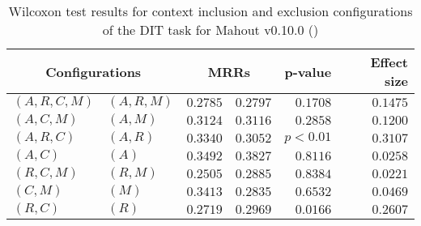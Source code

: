 
\begin{table}
\begin{spacing}{1.2}
\centering
\caption{Wilcoxon test results for context inclusion and exclusion configurations of the DIT task for Mahout v0.10.0 (\ctwo)}
\label{table:versus-wilcox-mahout-dit-context}
\begin{tabular}{ll|rr|rr}
\toprule
      \multicolumn{2}{c|}{Configurations} &                \multicolumn{2}{c|}{MRRs} &             p-value & Effect size \\
\midrule
 $(A,R,C,M)$ &  $(A,R,M)$ &       $0.2785$ &  $\bm{0.2797}$ & $0.1708$ &    $0.1475$ \\
   $(A,C,M)$ &    $(A,M)$ &  $\bm{0.3124}$ &       $0.3116$ & $0.2858$ &    $0.1200$ \\
   $(A,R,C)$ &    $(A,R)$ &  $\bm{0.3340}$ &       $0.3052$ & $p<0.01$ &    $0.3107$ \\
     $(A,C)$ &      $(A)$ &       $0.3492$ &  $\bm{0.3827}$ & $0.8116$ &    $0.0258$ \\
   $(R,C,M)$ &    $(R,M)$ &       $0.2505$ &  $\bm{0.2885}$ & $0.8384$ &    $0.0221$ \\
     $(C,M)$ &      $(M)$ &  $\bm{0.3413}$ &       $0.2835$ & $0.6532$ &    $0.0469$ \\
     $(R,C)$ &      $(R)$ &       $0.2719$ &  $\bm{0.2969}$ & $0.0166$ &    $0.2607$ \\
\bottomrule
\end{tabular}

\end{spacing}
\end{table}

